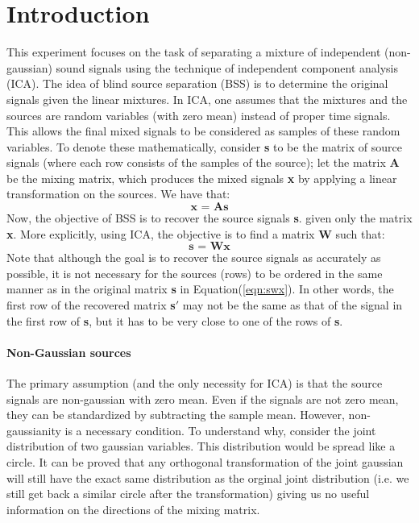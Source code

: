 \documentclass[11pt]{article}
\begin{document}
\section{Introduction}
This experiment focuses on the task of separating a mixture of independent (non-gaussian) sound signals using the technique of independent component analysis (ICA). The idea of blind source separation (BSS) is to determine the original signals given the linear mixtures. In ICA, one assumes that the mixtures and the sources are random variables (with zero mean) instead of proper time signals. This allows the final mixed signals to be considered as samples of these random variables. 
To denote these mathematically, consider \textbf{s} to be the matrix of source signals (where each row consists of the samples of the source); let the matrix \textbf{A} be the mixing matrix, which produces the mixed signals \textbf{x} by applying a linear transformation on the sources.
We have that:
\begin{equation}
	\textbf{x = As}
\end{equation}
Now, the objective of BSS is to recover the source signals \textbf{s}. given only the matrix \textbf{x}. More explicitly, using ICA, the objective is to find a matrix \textbf{W} such that:
\begin{equation}\label{eqn:swx}
	\textbf{s = Wx}
\end{equation}
Note that although the goal is to recover the source signals as accurately as possible, it is not necessary for the sources (rows) to be ordered in the same manner as in the original matrix \textbf{s} in Equation(\ref{eqn:swx}). In other words, the first row of the recovered matrix \textbf{s$'$} may not be the same as that of the signal in the first row of \textbf{s}, but it has to be very close to one of the rows of \textbf{s}.

\paragraph{Non-Gaussian sources} 
The primary assumption (and the only necessity for ICA) is that the source signals are non-gaussian with zero mean. Even if the signals are not zero mean, they can be standardized by subtracting the sample mean. However, non-gaussianity is a necessary condition. To understand why, consider the joint distribution of two gaussian variables. This distribution would be spread like a circle. It can be proved that any orthogonal transformation of the joint gaussian will still have the exact same distribution as the orginal joint distribution (i.e. we still get back a similar circle after the transformation) giving us no useful information on the directions of the mixing matrix.
\end{document}
